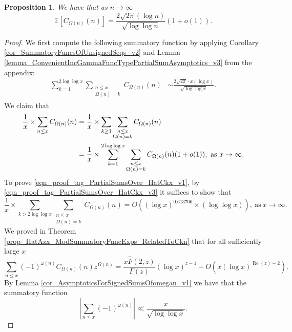 \documentclass[11pt,reqno,a4letter]{article}
\numberwithin{figure}{section}
\numberwithin{table}{section}
\theoremstyle{plain}
\newtheorem{prop}[theorem]{Proposition}
\numberwithin{theorem}{section}
\theoremstyle{definition}
\renewcommand{\Re}{\operatorname{Re}}
\begin{document}
\begin{prop} 
\label{lemma_HatCAstxSum_ExactFormulaWithError_v1} 
We have that as $n \rightarrow \infty$ 
\[
\mathbb{E}\left[C_{\Omega(n)}(n)\right] = 
     \frac{2 \sqrt{2\pi} (\log n)}{\sqrt{\log\log n}} (1+o(1)). 
\] 
\end{prop} 
\begin{proof} 
We first compute the following 
summatory function by applying 
Corollary \ref{cor_SummatoryFuncsOfUnsignedSeqs_v2} and 
Lemma \ref{lemma_ConvenientIncGammaFuncTypePartialSumAsymptotics_v3} from the appendix:
\begin{align} 
\label{eqn_proof_tag_PartialSumsOver_HatCkx_v3} 
\sum_{k=1}^{2\log\log x} \sum_{\substack{n \leq x \\ \Omega(n) = k}} C_{\Omega(n)}(n) & \sim 
     \frac{2 \sqrt{2\pi} \cdot x (\log x)}{\sqrt{\log\log x}}. 
\end{align} 
We claim that 
\begin{align} 
\notag 
\frac{1}{x} \times \sum_{n \leq x} C_{\Omega(n)}(n) & = \frac{1}{x} \times 
     \sum_{k \geq 1} \sum_{\substack{n \leq x \\ \Omega(n) = k}} C_{\Omega(n)}(n) \\ 
\label{eqn_proof_tag_PartialSumsOver_HatCkx_v1} 
     & = 
     \frac{1}{x} \times \sum_{k=1}^{2\log\log x} \sum_{\substack{n \leq x \\ \Omega(n) = k}} 
     C_{\Omega(n)}(n) (1+o(1)), 
     \text{ as } x \rightarrow \infty. 
\end{align} 
To prove \eqref{eqn_proof_tag_PartialSumsOver_HatCkx_v1}, by 
\eqref{eqn_proof_tag_PartialSumsOver_HatCkx_v3} it suffices to show that 
\begin{equation} 
\label{eqn_proof_tag_PartialSumsOver_HatCkx_EquivCond_v2} 
\frac{1}{x} \times 
     \sum\limits_{k > 2\log\log x} \sum\limits_{\substack{n \leq x \\ \Omega(n) = k}} C_{\Omega(n)}(n)
     = O\left((\log x)^{0.613706} \times (\log\log x)\right), 
     \mathrm{\ as\ } x \rightarrow \infty. 
\end{equation} 
We proved in Theorem \ref{prop_HatAzx_ModSummatoryFuncExps_RelatedToCkn} 
that for all sufficiently large $x$ 
\[
\sum_{n \leq x} (-1)^{\omega(n)} C_{\Omega(n)}(n) z^{\Omega(n)} = 
     \frac{x \widehat{F}(2, z)}{\Gamma(z)} (\log x)^{z-1} + O\left( 
     x (\log x)^{\Re(z)-2}\right). 
\]
By Lemma \ref{cor_AsymptoticsForSignedSumsOfomegan_v1} 
we have that the summatory function 
\[
\left\lvert \sum_{n \leq x} (-1)^{\omega(n)} \right\rvert \ll 
     \frac{x}{\sqrt{\log\log x}}. 
\]
\end{proof}
\end{document}
